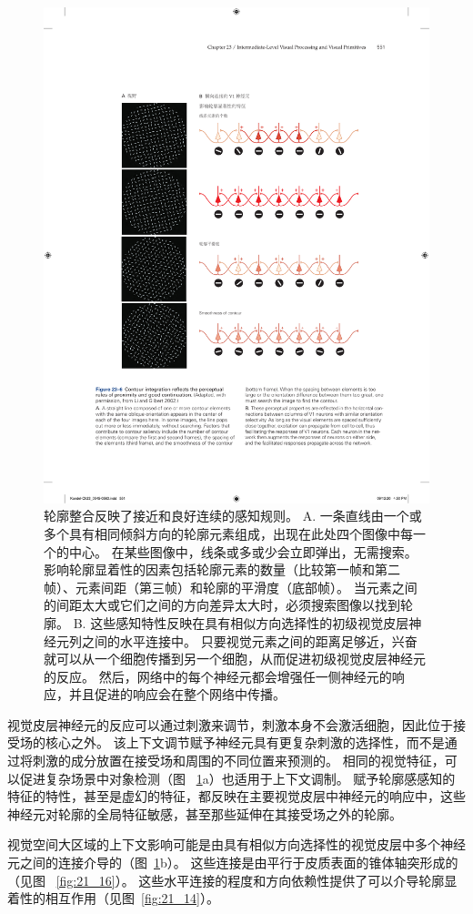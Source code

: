\begin{figure}[htbp]
	\centering
	\includegraphics[width=0.75\linewidth]{chap23/fig_23_6}
	\caption{轮廓整合反映了接近和良好连续的感知规则\cite{li2002global}。
		A. 一条直线由一个或多个具有相同倾斜方向的轮廓元素组成，出现在此处四个图像中每一个的中心。
		在某些图像中，线条或多或少会立即弹出，无需搜索。
		影响轮廓显着性的因素包括轮廓元素的数量（比较第一帧和第二帧）、元素间距（第三帧）和轮廓的平滑度（底部帧）。
		当元素之间的间距太大或它们之间的方向差异太大时，必须搜索图像以找到轮廓。
		B. 这些感知特性反映在具有相似方向选择性的初级视觉皮层神经元列之间的水平连接中。
		只要视觉元素之间的距离足够近，兴奋就可以从一个细胞传播到另一个细胞，从而促进初级视觉皮层神经元的反应。
		然后，网络中的每个神经元都会增强任一侧神经元的响应，并且促进的响应会在整个网络中传播。}
	\label{fig:23_6}
\end{figure}


视觉皮层神经元的反应可以通过刺激来调节，刺激本身不会激活细胞，因此位于接受场的核心之外。
该上下文调节赋予神经元具有更复杂刺激的选择性，而不是通过将刺激的成分放置在接受场和周围的不同位置来预测的。
相同的视觉特征，可以促进复杂场景中对象检测（图 ~\ref{fig:23_6}a）也适用于上下文调制。
赋予轮廓感感知的特征的特性，甚至是虚幻的特征，都反映在主要视觉皮层中神经元的响应中，这些神经元对轮廓的全局特征敏感，甚至那些延伸在其接受场之外的轮廓。


视觉空间大区域的上下文影响可能是由具有相似方向选择性的视觉皮层中多个神经元之间的连接介导的（图~\ref{fig:23_6}b）。
这些连接是由平行于皮质表面的锥体轴突形成的（见图 ~\ref{fig:21_16}）。
这些水平连接的程度和方向依赖性提供了可以介导轮廓显着性的相互作用（见图~\ref{fig:21_14}）。


